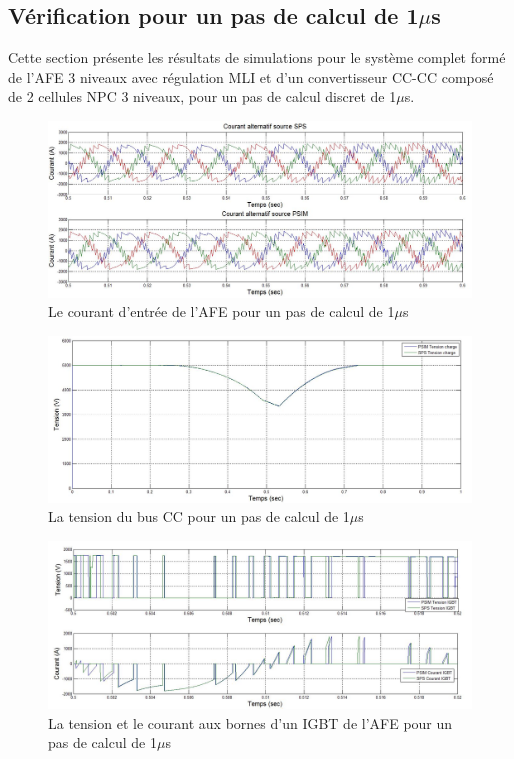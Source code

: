 \subsection{Vérification pour un pas de calcul de 1$\mu$s}
Cette section présente les résultats de simulations pour le système complet formé de l'AFE 3 niveaux avec régulation MLI et d'un convertisseur CC-CC composé de 2 cellules NPC 3 niveaux, pour un pas de calcul discret de 1$\mu$s. 

\begin{figure}[htb]
\centering
\includegraphics[scale=0.5]{fig/DCP_AFE/1u/cour_al.jpg}
\caption{Le courant d'entrée de l'AFE pour un pas de calcul de 1$\mu$s}
\label{AF_DC_cou1}
\end{figure}


\begin{figure}[htb]
\centering
\includegraphics[scale=0.5]{fig/DCP_AFE/1u/ten_bus.jpg}
\caption{La tension du bus CC pour un pas de calcul de 1$\mu$s}
\label{AF_DC_vch1}
\end{figure}



\begin{figure}[htb]
\centering
\includegraphics[scale=0.5]{fig/DCP_AFE/1u/IGBT_afe.jpg}
\caption{La tension et le courant aux bornes d'un IGBT de l'AFE pour un pas de calcul de 1$\mu$s}
\label{AF_DC_IGBT1}
\end{figure}


